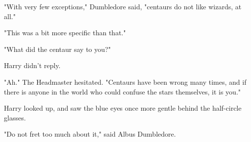 "With very few exceptions," Dumbledore said, "centaurs do not like wizards, at
all."

"This was a bit more specific than that."

"What did the centaur say to you?"

Harry didn't reply.

"Ah." The Headmaster hesitated. "Centaurs have been wrong many times, and if
there is anyone in the world who could confuse the stars themselves, it is you."

Harry looked up, and saw the blue eyes once more gentle behind the half-circle
glasses.

"Do not fret too much about it," said Albus Dumbledore.
